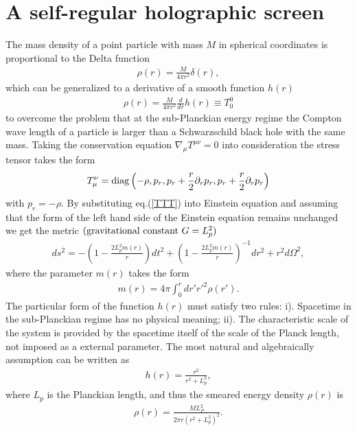 \documentclass[12pt]{article}
\begin{document}
\section{A self-regular holographic screen}
The mass density of a point particle with mass $M$ in spherical coordinates is proportional to the Delta function
\begin{eqnarray}
\rho(r) = \frac{M}{4 \pi r^2} \delta(r),
\end{eqnarray}
which can be generalized to a derivative of a smooth function $h(r)$ \cite{NICOLINISSS}
\begin{eqnarray}
\rho(r) = \frac{M}{4 \pi r^2} \frac{d}{dr} h(r) \equiv T_0^0
\end{eqnarray}
to overcome the problem that at  the sub-Planckian energy regime the Compton wave length of a particle is larger than  a Schwarzschild  black hole  with the same mass. Taking the conservation equation $\nabla_\mu T^{\mu\nu} = 0$ into consideration the stress tensor
takes the form
\begin{eqnarray}
T_\mu^\nu = {\rm diag}\left( -\rho, p_r, p_r + \frac{r}{2} \partial_r p_r, p_r + \frac{r}{2} \partial_r p_r \right) \label{TTT}
\end{eqnarray}
with $p_r = -\rho$.
By substituting eq.(\ref{TTT}) into Einstein equation and assuming that the form of the left hand side of the Einstein equation remains unchanged
we get the metric $( {\rm gravitational \ constant}\ G= L_p^2)$
\begin{eqnarray}
ds^2 = -\left(1- \frac{2 L_p^2 m(r)}{r}\right) dt^2  + \left(1- \frac{2 L_p^2 m(r)}{r}   \right)^{-1} dr^2 +r^2 d\Omega^2,
\end{eqnarray}
where the parameter $m(r)$ takes the form
\begin{eqnarray}
m(r) =  4 \pi \int_0^r dr' {r'}^2 \rho(r').
\end{eqnarray}
The particular form of the function $h(r)$ must satisfy two rules\cite{NICOLINISSS}:
i). Spacetime in the sub-Planckian regime has no physical meaning;
ii). The characteristic scale of the system is provided by the spacetime itself of the scale of the Planck length, not imposed as a external parameter.
The most natural and algebraically assumption can be written as
\begin{eqnarray}
h(r) =  \frac{r^2}{r^2 + L_p^2},
\end{eqnarray}
where $L_p$ is the Planckian length,  and thus the smeared energy density $\rho(r)$  is
\begin{eqnarray}
\rho(r) = \frac{M L_P^2}{2 \pi r \left( r^2 + L_p^2 \right)^2}.
\end{eqnarray}
\end{document}
